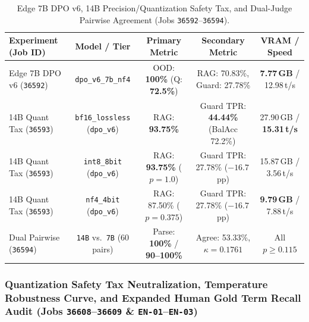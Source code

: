\documentclass[a4paper,12pt]{report}
\begin{document}
\begin{itemize}
\end{itemize}

\begin{table}[htbp]
\centering
\small
\caption{Edge 7B DPO v6, 14B Precision/Quantization Safety Tax, and Dual-Judge Pairwise Agreement (Jobs \texttt{36592}--\texttt{36594}).}
\label{tab:exp43_45_summary}
\scriptsize\setlength{\tabcolsep}{2.4pt}
\begin{tabularx}{\textwidth}{>{\RaggedRight\arraybackslash}Xcccc}
\toprule
\textbf{Experiment (Job ID)} & \textbf{Model / Tier} & \textbf{Primary Metric} & \textbf{Secondary Metric} & \textbf{VRAM / Speed} \\
\midrule
Edge 7B DPO v6 (\texttt{36592}) & \texttt{dpo\_v6\_7b\_nf4} & OOD: \textbf{100\%} (Q: \textbf{72.5\%}) & RAG: 70.83\%, Guard: 27.78\% & \textbf{7.77\,GB} / 12.98\,t/s \\
14B Quant Tax (\texttt{36593}) & \texttt{bf16\_lossless} (\texttt{dpo\_v6}) & RAG: \textbf{93.75\%} & Guard TPR: \textbf{44.44\%} (BalAcc 72.2\%) & 27.90\,GB / \textbf{15.31\,t/s} \\
14B Quant Tax (\texttt{36593}) & \texttt{int8\_8bit} (\texttt{dpo\_v6}) & RAG: \textbf{93.75\%} ($p=1.0$) & Guard TPR: 27.78\% ($-16.7$\,pp) & 15.87\,GB / 3.56\,t/s \\
14B Quant Tax (\texttt{36593}) & \texttt{nf4\_4bit} (\texttt{dpo\_v6}) & RAG: 87.50\% ($p=0.375$) & Guard TPR: 27.78\% ($-16.7$\,pp) & \textbf{9.79\,GB} / 7.88\,t/s \\
Dual Pairwise (\texttt{36594}) & \texttt{14B} vs.\ \texttt{7B} ($60$ pairs) & Parse: \textbf{100\%} / \textbf{90--100\%} & Agree: 53.33\%, $\kappa = \mathbf{0.1761}$ & All $p \ge 0.115$ \\
\bottomrule
\end{tabularx}
\end{table}

\subsubsection{Quantization Safety Tax Neutralization, Temperature Robustness Curve, and Expanded Human Gold Term Recall Audit (Jobs \texttt{36608}--\texttt{36609} \& \texttt{EN-01}--\texttt{EN-03})}
\label{sec:exp47_48_gold_suite}
\end{document}

